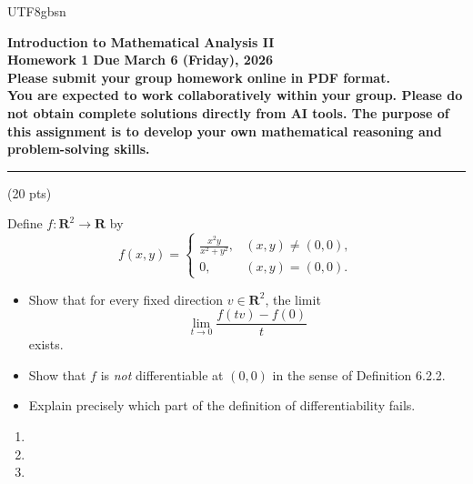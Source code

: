 \documentclass[addpoints]{exam}
\theoremstyle{definition}
\begin{document}
\begin{CJK*}{UTF8}{gbsn}
\begin{center}
    {\Large{\bf Introduction to Mathematical Analysis II\\
    Homework 1  Due  March 6  (Friday), 2026\\
    Please submit your group homework online in PDF format.\\
You are expected to work collaboratively within your group. 
Please do not obtain complete solutions directly from AI tools. 
The purpose of this assignment is to develop your own mathematical reasoning and problem-solving skills. %
  }} \\ 
    \large
\end{center}

\noindent\rule{16.2cm}{0.4pt}


\begin{questions}


\question  (20 pts)  

 Define $f : \mathbf{R}^2 \to \mathbf{R}$ by
$$
f(x,y)=
\begin{cases}
\displaystyle
\frac{x^2 y}{x^2+y^2}, & (x,y)\neq(0,0),\\[1em]
0, & (x,y)=(0,0).
\end{cases}
$$

\begin{itemize}
\item[(a)] Show that for every fixed direction $v\in\mathbf{R}^2$, 
the limit
$$
\lim_{t\to 0} \frac{f(tv)-f(0)}{t}
$$
exists.

\item[(b)] Show that $f$ is \emph{not} differentiable at $(0,0)$
in the sense of Definition 6.2.2.

\item[(c)] Explain precisely which part of the definition of differentiability fails.
\end{itemize}

\begin{solution} 
\begin{enumerate}
\item[(a)] 



\bigskip
\item[(b)] 


\bigskip
\item[(c)] 

\end{enumerate}


\end{solution}
\end{questions}
\end{CJK*}
\end{document}
